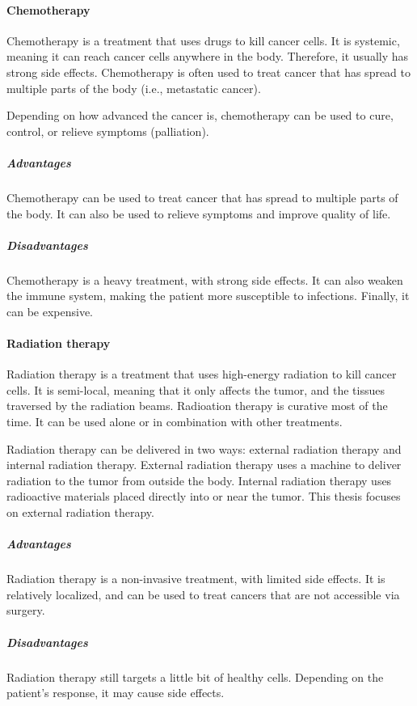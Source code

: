 \paragraph{Chemotherapy}
Chemotherapy is a treatment that uses drugs to kill cancer cells.
It is systemic, meaning it can reach cancer cells anywhere in the body.
Therefore, it usually has strong side effects.
Chemotherapy is often used to treat cancer that has spread to multiple parts of the body (i.e., metastatic cancer).

Depending on how advanced the cancer is, chemotherapy can be used to cure, control, or relieve symptoms (palliation).

\subparagraph{Advantages}
Chemotherapy can be used to treat cancer that has spread to multiple parts of the body.
It can also be used to relieve symptoms and improve quality of life.

\subparagraph{Disadvantages}
Chemotherapy is a heavy treatment, with strong side effects.
It can also weaken the immune system, making the patient more susceptible to infections.
Finally, it can be expensive.

\paragraph{Radiation therapy}
Radiation therapy is a treatment that uses high-energy radiation to kill cancer cells.
It is semi-local, meaning that it only affects the tumor, and the tissues traversed by the radiation beams.
Radioation therapy is curative most of the time.
It can be used alone or in combination with other treatments.

Radiation therapy can be delivered in two ways: external radiation therapy and internal radiation therapy.
External radiation therapy uses a machine to deliver radiation to the tumor from outside the body.
Internal radiation therapy uses radioactive materials placed directly into or near the tumor.
This thesis focuses on external radiation therapy.

\subparagraph{Advantages}
Radiation therapy is a non-invasive treatment, with limited side effects.
It is relatively localized, and can be used to treat cancers that are not accessible via surgery.

\subparagraph{Disadvantages}
Radiation therapy still targets a little bit of healthy cells.
Depending on the patient's response, it may cause side effects.

